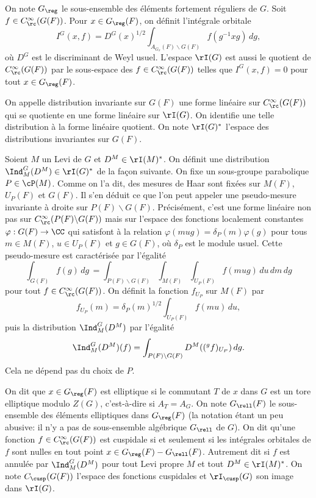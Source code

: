 On note $G_{\reg}$ le sous-ensemble des éléments fortement réguliers de $G$. Soit $f\in C_{\rc}^{\infty}(G(F))$. Pour $x\in G_{\reg}(F)$, on définit l'intégrale orbitale
\[
I^G(x,f)=D^G(x)^{1/2}\int_{A_{G_{x}}(F)\backslash G(F)}f(g^{-1}xg)\,dg,
\]
où $D^G$ est le discriminant de Weyl usuel. L'espace $\rI(G)$ est aussi le quotient de $C_{\rc}^{\infty}(G(F))$ par le sous-espace des $f\in C_{\rc}^{\infty}(G(F))$ telles que $I^G(x,f)=0$ pour tout $x\in G_{\reg}(F)$.

On appelle distribution invariante sur $G(F)$ une forme linéaire sur $C_{\rc}^{\infty}(G(F))$ qui se quotiente en une forme linéaire sur $\rI(G)$. On identifie une telle distribution à la forme linéaire quotient. On note $\rI(G)^*$ l'espace des distributions invariantes sur $G(F)$.

Soient $M$ un Levi de $G$ et $D^M\in \rI(M)^*$. On définit une distribution $\Ind_{M}^G(D^M)\in \rI(G)^*$ de la façon suivante. On fixe un sous-groupe parabolique $P\in \cP(M)$. Comme on l'a dit, des mesures de Haar sont fixées sur $M(F)$, $U_{P}(F)$ et $G(F)$. Il s'en déduit ce que l'on peut appeler une pseudo-mesure invariante à droite sur $P(F)\backslash G(F)$. Précisément, c'est une forme linéaire non pas sur $C_{\rc}^{\infty}(P(F)\backslash G(F))$ mais sur l'espace des fonctions localement constantes $\varphi:G(F)\to \CC$ qui satisfont à la relation $\varphi(mug)=\delta_{P}(m)\varphi(g)$ pour tous $m\in M(F)$, $u\in U_{P}(F)$ et $g\in G(F)$, où $\delta_{P}$ est le module usuel. Cette pseudo-mesure est caractérisée par l'égalité
\[
\int_{G(F)}f(g)\,dg\,=\int_{P(F)\backslash G(F)}\int_{M(F)}\int_{U_{P}(F)}f(mug)\,du\,dm\,dg
\]
pour tout $f\in C_{\rc}^{\infty}(G(F))$.
On définit la fonction $f_{U_{P}}$ sur $M(F)$ par
\[
f_{U_{P}}(m)=\delta_{P}(m)^{1/2}\int_{U_{P}(F)}f(mu)\,du,
\]
puis la distribution $\Ind_{M}^G(D^M)$ par l'égalité
\[
\Ind_{M}^G(D^M)(f)=\int_{P(F)\backslash G(F)}D^M(({^g}f)_{U_{P}})\,dg.
\]
Cela ne dépend pas du choix de $P$.

On dit que $x\in G_{\reg}(F)$ est elliptique si le commutant $T$ de $x$ dans $G$ est un tore elliptique modulo $Z(G)$, c'est-à-dire si $A_{T}=A_{G}$. On note $G_{\rell}(F)$ le sous-ensemble des éléments elliptiques dans $G_{\reg}(F)$ (la notation étant un peu abusive: il n'y a pas de sous-ensemble algébrique $G_{\rell}$ de $G$). On dit qu'une fonction $f\in C_{\rc}^{\infty}(G(F))$ est cuspidale si et seulement si les intégrales orbitales de $f$ sont nulles en tout point $x\in G_{\reg}(F)-G_{\rell}(F)$. Autrement dit si $f$ est annulée par $\Ind_{M}^G(D^M)$ pour tout Levi propre $M$ et tout $D^M\in \rI(M)^*$. On note $C_{\cusp}(G(F))$ l'espace des fonctions cuspidales et $\rI_{\cusp}(G)$ son image dans $\rI(G)$.

